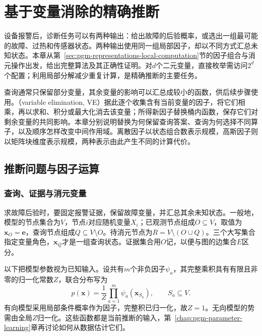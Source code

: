 \chapter{基于变量消除的精确推断}
\label{chap:pgm-elimination}

设备报警后，诊断任务可以有两种输出：给出故障的后验概率，或选出一组最可能的故障、过热和传感器状态。两种输出使用同一组局部因子，却以不同方式汇总未知状态。本章从第~\ref{sec:pgm-representations-local-computation}节的因子组合与消元操作出发，给出完整算法及其正确性证明。对$d$个二元变量，直接枚举需访问$2^d$个配置；利用局部分解减少重复计算，是精确推断的主要任务。

查询通常只保留部分变量，其余变量的影响可以汇总成较小的函数，供后续步骤使用。（variable elimination, VE）据此逐个收集含有当前变量的因子，将它们相乘，再以求和、积分或最大化消去该变量；所得新因子替换桶内函数，保存它们对剩余变量的共同影响。本章分别说明替换为何保留查询答案、查询为何选择不同算子，以及顺序怎样改变中间作用域。离散因子以状态组合数表示规模，高斯因子则以矩阵块维度表示规模，两种表示由此产生不同的计算代价。

\section{推断问题与因子运算}
\label{sec:pgm-elimination-factor-operations}

\subsection{查询、证据与消元变量}
\label{sec:pgm-elimination-query-evidence}

求故障后验时，要固定报警证据，保留故障变量，并汇总其余未知状态。一般地，模型的节点集合为$V$，节点$i$对应随机变量$X_i$；已观测节点组成$O\subseteq V$，取值为$\bm{x}_O=\bm{e}$，查询节点组成$Q\subseteq V\setminus O$。待消元节点为$R=V\setminus(O\cup Q)$。三个大写集合指定变量角色，$\bm{x}_Q$才是一组查询状态。证据集合用$O$记，以便与图的边集合$E$区分。

以下把模型参数视为已知输入。设共有$m$个非负因子$\psi_a$，其完整乘积具有有限且非零的归一化常数$Z$，联合分布写为
\begin{equation}
  p(\bm{x})=\frac{1}{Z}\prod_{a=1}^{m}\psi_a(\bm{x}_{S_a}),
  \qquad S_a\subseteq V.
  \label{eq:pgm-elimination-factorization}
\end{equation}
有向模型采用局部条件概率作为因子，完整积已归一化，故$Z=1$。无向模型的势需由全局$Z$归一化。这些函数都是当前推断的输入，第~\ref{chap:pgm-parameter-learning}章再讨论如何从数据估计它们。

